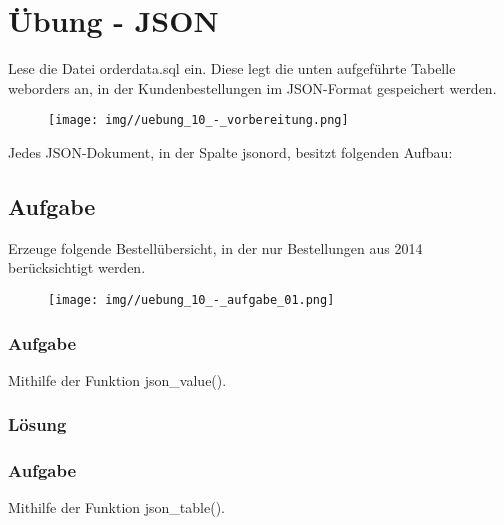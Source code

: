 \section{Übung - JSON}
\label{sec:uebung_10}
Lese die Datei orderdata.sql ein. Diese legt die unten aufgeführte Tabelle weborders an, in der Kundenbestellungen im JSON-Format gespeichert werden.

\begin{figure}[H]
  \centering
  \texttt{[image: img//uebung\_10\_-\_vorbereitung.png]}
  \label{img:uebung_10_-_vorbereitung}
\end{figure}

Jedes JSON-Dokument, in der Spalte jsonord, besitzt folgenden Aufbau:

\label{subsec:uebung_10.aufgabe_01}
\subsection{Aufgabe}
Erzeuge folgende Bestellübersicht, in der nur Bestellungen aus 2014 berücksichtigt werden.

\begin{figure}[H]
  \centering
  \texttt{[image: img//uebung\_10\_-\_aufgabe\_01.png]}
  \label{img:uebung_10_-_aufgabe_01}
\end{figure}

\label{subsec:uebung_10.aufgabe_01a}
\subsubsection{Aufgabe}
Mithilfe der Funktion json\_value().

\subsubsection*{Lösung}
\label{subsubsec:uebung_10.aufgabe_01a.loesung}


\label{subsec:uebung_10.aufgabe_01b}
\subsubsection{Aufgabe}
Mithilfe der Funktion json\_table().

